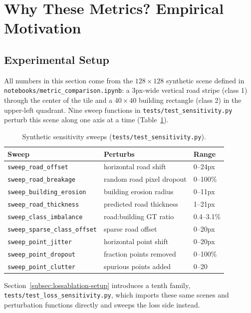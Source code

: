 \section{Why These Metrics? Empirical Motivation}
\label{sec:motivation}

\subsection{Experimental Setup}
\label{subsec:motivation-setup}

All numbers in this section come from the $128\times128$ synthetic scene defined in
\texttt{notebooks/metric\_comparison.ipynb}: a 3px-wide vertical road stripe (class 1) through the
center of the tile and a $40\times40$ building rectangle (class 2) in the upper-left quadrant. Nine
sweep functions in \texttt{tests/test\_sensitivity.py} perturb this scene along one axis at a
time (Table~\ref{tab:sweeps}).

\begin{table}
  \caption{Synthetic sensitivity sweeps (\texttt{tests/test\_sensitivity.py}).}
  \label{tab:sweeps}
  \begin{tabular}{@{}l>{\raggedright\arraybackslash}p{2.4cm}l@{}}
    \toprule
    Sweep & Perturbs & Range \\
    \midrule
    \texttt{sweep\_road\_offset} & horizontal road shift & 0--24px \\
    \texttt{sweep\_road\_breakage} & random road pixel dropout & 0--100\% \\
    \texttt{sweep\_building\_erosion} & building erosion radius & 0--11px \\
    \texttt{sweep\_road\_thickness} & predicted road thickness & 1--21px \\
    \texttt{sweep\_class\_imbalance} & road:building GT ratio & 0.4--3.1\% \\
    \texttt{sweep\_sparse\_class\_offset} & sparse road offset & 0--20px \\
    \texttt{sweep\_point\_jitter} & horizontal point shift & 0--20px \\
    \texttt{sweep\_point\_dropout} & fraction points removed & 0--100\% \\
    \texttt{sweep\_point\_clutter} & spurious points added & 0--20 \\
    \bottomrule
  \end{tabular}
\end{table}

Section~\ref{subsec:lossablation-setup} introduces a tenth family,
\texttt{tests/test\_loss\_sensitivity.py}, which imports these same scenes and perturbation
functions directly and sweeps the loss side instead.

